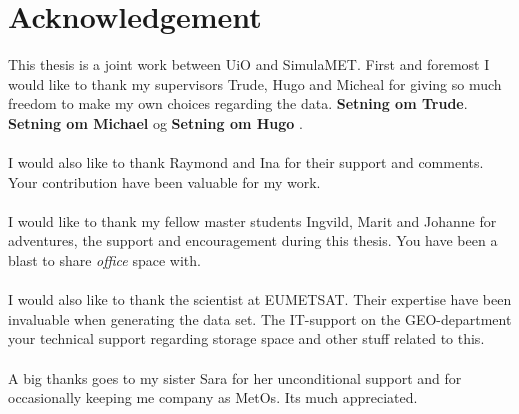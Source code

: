\chapter*{Acknowledgement}
This thesis is a joint work between UiO and SimulaMET. First and foremost I would like to thank my supervisors Trude, Hugo and Micheal for giving so much freedom to make my own choices regarding the data. \textbf{Setning om Trude}. \textbf{Setning om Michael} og \textbf{Setning om Hugo }.
\\ \\
I would also like to thank Raymond and Ina for their support and comments. Your contribution have been valuable for my work.
\\ \\
I would like to thank my fellow master students Ingvild, Marit and Johanne for adventures, the support and encouragement during this thesis. You have been a blast to share \textit{office} space with.
\\ \\ 
I would also like to thank the scientist at EUMETSAT. %
Their expertise have been invaluable when generating the data set. 
The IT-support on the GEO-department your technical support regarding storage space and other stuff related to this. 
\\ \\
A big thanks goes to my sister Sara for her unconditional support and for occasionally keeping me company as MetOs. Its much appreciated. 
\cleardoublepage